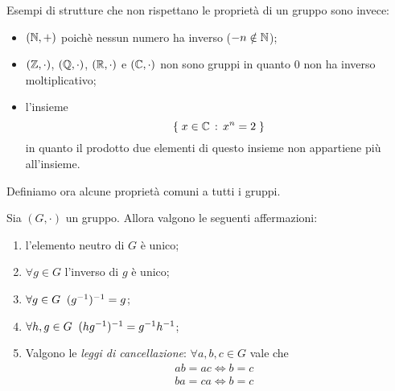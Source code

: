 Esempi di strutture che non rispettano le proprietà di un gruppo sono invece:
\begin{itemize}
    \item $(\mathbb{N}, +)$ poichè nessun numero ha inverso ($-n \notin \mathbb{N}$);
    \item $(\mathbb{Z}, \cdot)$, $(\mathbb{Q}, \cdot)$, $(\mathbb{R}, \cdot)$ e $(\mathbb{C}, \cdot)$ non sono gruppi in quanto $0$ non ha inverso moltiplicativo;
    \item l'insieme \[
        \left\{\;x \in \mathbb{C} \,:\, x^n = 2\;\right\}    
    \] in quanto il prodotto due elementi di questo insieme non appartiene più all'insieme.
\end{itemize}

Definiamo ora alcune proprietà comuni a tutti i gruppi.

\begin{proposition}
     \label{prop:prop_grp}
    Sia $(G, \cdot)$ un gruppo. Allora valgono le seguenti affermazioni:
    \begin{enumerate}[label={(\roman*)}, ref={\theproposition: (\roman*)}]
        \item \label{prop:prop_grp:e_unico} l'elemento neutro di $G$ è unico;\
        \item \label{prop:prop_grp:inv_unico} $\forall g \in G$ l'inverso di $g$ è unico;
        \item \label{prop:prop_grp:inv_inv} $\forall g \in G \;\; (g^{-1})^{-1} = g$;
        \item \label{prop:prop_grp:inv_prod} $\forall h, g \in G \;\; (hg^{-1})^{-1} = g^{-1} h^{-1}$; 
        \item \label{prop:prop_grp:canc} Valgono le \emph{leggi di cancellazione}: $\forall a, b, c \in G$ vale che \begin{align}
            ab = ac \iff b = c &\tag{sx} \label{prop:prop_grp:canc:sx}\\
            ba = ca \iff b = c &\tag{dx} \label{prop:prop_grp:canc:dx}
        \end{align}
    \end{enumerate}
\end{proposition}
